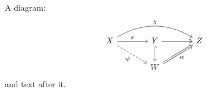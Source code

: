\documentclass{article}
\begin{document}
A diagram:
\[
\begin{tikzcd}[column sep=large]
  X \arrow[r, "\varphi"] \arrow[dr, dashed, "\psi"'] \arrow[rr, bend left, "\chi"] & Y \arrow[d, hook] \arrow[r, two heads] & Z \\
  & W \arrow[ur, Rightarrow, "\alpha"'] &
\end{tikzcd}
\]
and text after it.
\end{document}
